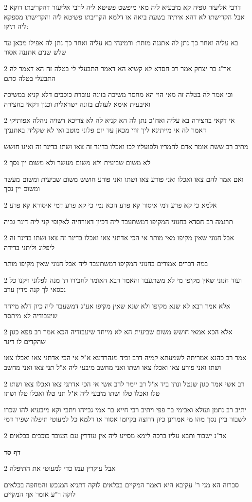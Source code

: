 \documentclass[12pt, openany]{book}
\newcommand{\sethebfont}{
\fontsize{10.5pt}{21.0pt} \selectfont
}
\newcommand{\twocol}[1]{
	{\sethebfont \begin{multicols}{2}
			#1
	\end{multicols}}	
}
\newcommand{\sectname}{}
\newcommand{\newsection}[1]{
	\addcontentsline{toc}{section}{#1}
	\renewcommand{\sectname}{#1}	
	\vspace{-\baselineskip}
	\begin{center}
		\textbf{%
\fontsize{16pt}{16pt}\selectfont
			#1}
	\end{center}
	\vspace{-\baselineskip}
	\nopagebreak
}
\begin{document}
\twocol{דרבי אליעזר גופיה קא מיבעיא ליה מאי מיפשט פשיטא ליה לרבי אליעזר דהקריבתו דוקא אבל הקדישתו לא דהא איתיה בשעת ביאה או דלמא הקריבתו פשיטא ליה והקדישתו מספקא ליה תיקו:
\par בא עליה ואחר כך נתן לה אתננה מותר: ורמינהי בא עליה ואחר כך נתן לה אפילו מכאן עד שלש שנים אתננה אסור}
\twocol{אר"נ בר יצחק אמר רב חסדא לא קשיא הא דאמר התבעלי לי בטלה זה הא דאמר לה התבעלי בטלה סתם
\par וכי אמר לה בטלה זה מאי הוי הא מחסר משיכה בזונה עובדת כוכבים דלא קניא במשיכה ואיבעית אימא לעולם בזונה ישראלית וכגון דקאי בחצירה}
\twocol{אי דקאי בחצירה בא עליה ואח"כ נתן לה הא קניא לה לא צריכא דשויה ניהלה אפותיקי דאמר לה אי מייתינא ליך זוזי מכאן עד יום פלוני מוטב ואי לא שקליה באתנניך
\par מתיב רב ששת אומר אדם לחמריו ולפועליו לכו ואכלו בדינר זה צאו ושתו בדינר זה ואינו חושש}
\twocol{לא משום שביעית ולא משום מעשר ולא משום יין נסך
\par ואם אמר להם צאו ואכלו ואני פורע צאו ושתו ואני פורע חושש משום שביעית ומשום מעשר ומשום יין נסך}
\twocol{אלמא כי קא פרע דמי איסור קא פרע הכא נמי כי קא פרע דמי איסורא קא פרע
\par תרגמה רב חסדא בחנוני המקיפו דמשתעבד ליה דכיון דאורחיה לאקופי קני ליה דינר גביה}
\twocol{אבל חנוני שאין מקיפו מאי מותר אי הכי אדתני צאו ואכלו בדינר זה צאו ושתו בדינר זה ליפלוג וליתני בדידה
\par במה דברים אמורים בחנוני המקיפו דמשתעבד ליה אבל חנוני שאין מקיפו מותר}
\twocol{ועוד חנוני שאין מקיפו מי לא משתעבד והאמר רבא האומר לחבירו תן מנה לפלוני ויקנו כל נכסאי לך קנה מדין ערב
\par אלא אמר רבא לא שנא מקיפו ולא שנא שאין מקיפו אע"ג דמשעבד ליה כיון דלא מייחד שיעבודיה לא מיתסר}
\twocol{אלא הכא אמאי חושש משום שביעית הא לא מייחד שיעבודיה הכא אמר רב פפא כגון שהקדים לו דינר
\par אמר רב כהנא אמריתה לשמעתא קמיה דרב זביד מנהרדעא א"ל אי הכי אדתני צאו ואכלו צאו ושתו ואני פורע צאו ואכלו צאו ושתו ואני מחשב מיבעי ליה א"ל תני צאו ואני מחשב}
\twocol{רב אשי אמר כגון שנטל ונתן ביד א"ל רב יימר לרב אשי אי הכי אדתני צאו ואכלו צאו ושתו טלו ואכלו טלו ושתו מיבעי ליה א"ל תני טלו ואכלו טלו ושתו
\par יתיב רב נחמן ועולא ואבימי בר פפי ויתיב רבי חייא בר אמי גבייהו ויתבי וקא מיבעיא להו שכרו לשבור ביין נסך מהו מי אמרינן כיון דרוצה בקיומו אסור או דלמא כל למעוטי תיפלה שפיר דמי}
\twocol{אר"נ ישבור ותבא עליו ברכה לימא מסייע ליה אין עודרין עם העובד כוכבים בכלאים}
\newsection{דף סד}
\twocol{אבל עוקרין עמו כדי למעוטי את התיפלה
\par סברוה הא מני ר' עקיבא היא דאמר המקיים בכלאים לוקה דתניא המנכש והמחפה בכלאים לוקה ר"ע אומר אף המקיים}
\end{document}
